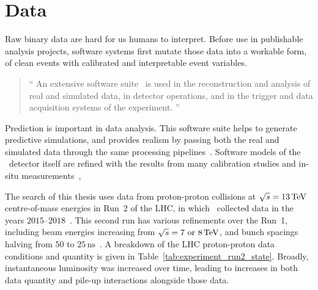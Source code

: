 \section{Data}
\label{sec:atlas_data}
Raw binary data are hard for us humans to interpret.
Before use in publishable analysis projects, software systems first mutate
those data into a workable form, of clean events with calibrated and
interpretable event variables.
\begin{quote}
``%
An extensive software suite~\cite{ATL-SOFT-PUB-2021-001} is used in the
reconstruction and analysis of real and simulated data, in detector operations,
and in the trigger and data acquisition systems of the experiment.%
''~\cite{atlas2022searches}
\end{quote}
Prediction is important in data analysis.
This software suite helps to generate predictive simulations, and provides
realism by passing both the real and simulated data through the same processing
pipelines~\cite{SOFT-2010-01, geant2003}.
Software models of the \atlas\ detector itself are refined with the results from
many calibration studies and in-situ measurements~\cite{atlas2008experiment},

The search of this thesis uses data from proton-proton collisions at
$\sqrt{s} = 13\,\eV[T]$ centre-of-mass energies in Run~2 of the
LHC, in which \atlas\ collected data in the years
$2015\textrm{--}2018$~\cite{atlas2022searches}.
This second run has various refinements over the Run~1, including beam energies
increasing from $\sqrt{s} = 7\textrm{ or }8\,\eV[T]$, and bunch spacings
halving from $50$ to $25\,\textrm{ns}$~\cite{lhc2006run2}.
A breakdown of the LHC proton-proton data conditions and quantity is given
in Table~\ref{tab:experiment_run2_state}.
Broadly, instantaneous luminosity was increased over time, leading to increases
in both data quantity and pile-up interactions alongside those data.

